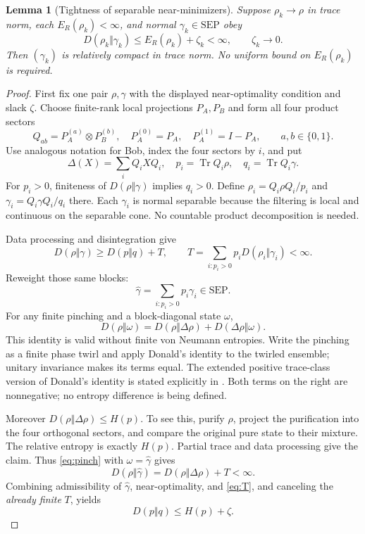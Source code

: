\documentclass[11pt,a4paper]{article}
\numberwithin{equation}{section}
\newtheorem{lemma}[theorem]{Lemma}
\theoremstyle{remark}
\newcommand{\tr}{\operatorname{Tr}}
\newcommand{\SEP}{\mathrm{SEP}}
\newcommand{\ER}{E_R}
\begin{document}
\begin{lemma}[Tightness of separable near-minimizers]\label{lem:tight}
Suppose \(\rho_k\to\rho\) in trace norm, each \(\ER(\rho_k)<\infty\), and
normal \(\gamma_k\in\SEP\) obey
\[
 D(\rho_k\Vert\gamma_k)\leq\ER(\rho_k)+\zeta_k<\infty,
 \qquad \zeta_k\to0.
\]
Then \((\gamma_k)\) is relatively compact in trace norm. No uniform bound
on \(\ER(\rho_k)\) is required.
\end{lemma}
\begin{proof}
First fix one pair \(\rho,\gamma\) with the displayed near-optimality
condition and slack \(\zeta\). Choose finite-rank local projections \(P_A,P_B\)
and form all four product sectors
\[
 Q_{ab}=P_A^{(a)}\otimes P_B^{(b)},\quad
 P_A^{(0)}=P_A,\quad P_A^{(1)}=I-P_A,
 \qquad a,b\in\{0,1\}.
\]
Use analogous notation for Bob, index the four sectors by \(i\), and put
\[
 \Delta(X)=\sum_iQ_iXQ_i,\quad p_i=\tr Q_i\rho,\quad q_i=\tr Q_i\gamma.
\]
For \(p_i>0\), finiteness of \(D(\rho\Vert\gamma)\) implies \(q_i>0\).
Define \(\rho_i=Q_i\rho Q_i/p_i\) and
\(\gamma_i=Q_i\gamma Q_i/q_i\) there. Each \(\gamma_i\) is normal
separable because the filtering is local and continuous on the separable
cone. No countable product decomposition is needed.

Data processing and disintegration give
\begin{equation}
 D(\rho\Vert\gamma)\geq D(p\Vert q)+T,\qquad
 T=\sum_{i:p_i>0}p_iD(\rho_i\Vert\gamma_i)<\infty. \label{eq:T}
\end{equation}
Reweight those same blocks:
\[
 \widehat\gamma=\sum_{i:p_i>0}p_i\gamma_i\in\SEP.
\]
For any finite pinching and a block-diagonal state \(\omega\),
\begin{equation}
 D(\rho\Vert\omega)
   =D(\rho\Vert\Delta\rho)+D(\Delta\rho\Vert\omega). \label{eq:pinch}
\end{equation}
This identity is valid without finite von Neumann entropies. Write the
pinching as a finite phase twirl and apply Donald's identity to the
twirled ensemble; unitary invariance makes its terms equal.
The extended positive trace-class version of Donald's identity is stated
explicitly in \cite[Eq.~(2.19)]{Shirokov}. Both terms on the right are
nonnegative; no entropy difference is being defined.

Moreover \(D(\rho\Vert\Delta\rho)\leq H(p)\). To see this, purify \(\rho\),
project the purification into the four orthogonal sectors, and compare
the original pure state to their mixture. The relative entropy is exactly
\(H(p)\). Partial trace and data processing give the claim.
Thus \eqref{eq:pinch} with \(\omega=\widehat\gamma\) gives
\[
 D(\rho\Vert\widehat\gamma)=D(\rho\Vert\Delta\rho)+T<\infty.
\]
Combining admissibility of \(\widehat\gamma\), near-optimality, and
\eqref{eq:T}, and canceling the \emph{already finite} \(T\), yields
\begin{equation}
 \boxed{D(p\Vert q)\leq H(p)+\zeta.}             \label{eq:noescape}
\end{equation}


\end{proof}
\end{document}

